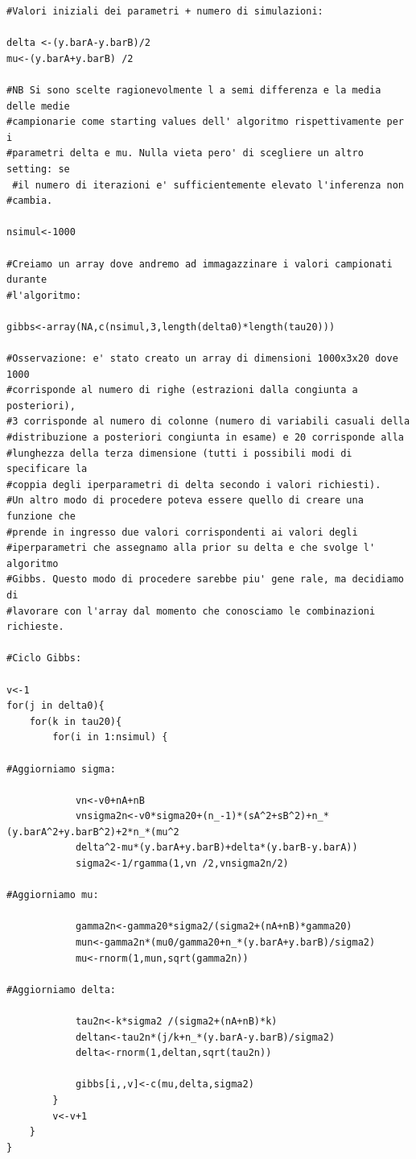 \begin{itemize}
\begin{lstlisting}[style=R]
#Valori iniziali dei parametri + numero di simulazioni:

delta <-(y.barA-y.barB)/2
mu<-(y.barA+y.barB) /2

#NB Si sono scelte ragionevolmente l a semi differenza e la media delle medie
#campionarie come starting values dell' algoritmo rispettivamente per i
#parametri delta e mu. Nulla vieta pero' di scegliere un altro setting: se
 #il numero di iterazioni e' sufficientemente elevato l'inferenza non
#cambia.

nsimul<-1000

#Creiamo un array dove andremo ad immagazzinare i valori campionati durante
#l'algoritmo:

gibbs<-array(NA,c(nsimul,3,length(delta0)*length(tau20)))

#Osservazione: e' stato creato un array di dimensioni 1000x3x20 dove 1000
#corrisponde al numero di righe (estrazioni dalla congiunta a posteriori),
#3 corrisponde al numero di colonne (numero di variabili casuali della
#distribuzione a posteriori congiunta in esame) e 20 corrisponde alla
#lunghezza della terza dimensione (tutti i possibili modi di specificare la
#coppia degli iperparametri di delta secondo i valori richiesti).
#Un altro modo di procedere poteva essere quello di creare una funzione che
#prende in ingresso due valori corrispondenti ai valori degli
#iperparametri che assegnamo alla prior su delta e che svolge l' algoritmo
#Gibbs. Questo modo di procedere sarebbe piu' gene rale, ma decidiamo di
#lavorare con l'array dal momento che conosciamo le combinazioni richieste.

#Ciclo Gibbs:

v<-1
for(j in delta0){
	for(k in tau20){
		for(i in 1:nsimul) {

#Aggiorniamo sigma:

			vn<-v0+nA+nB
			vnsigma2n<-v0*sigma20+(n_-1)*(sA^2+sB^2)+n_*(y.barA^2+y.barB^2)+2*n_*(mu^2
			delta^2-mu*(y.barA+y.barB)+delta*(y.barB-y.barA))
			sigma2<-1/rgamma(1,vn /2,vnsigma2n/2)

#Aggiorniamo mu:

			gamma2n<-gamma20*sigma2/(sigma2+(nA+nB)*gamma20)
			mun<-gamma2n*(mu0/gamma20+n_*(y.barA+y.barB)/sigma2)
			mu<-rnorm(1,mun,sqrt(gamma2n))

#Aggiorniamo delta:

			tau2n<-k*sigma2 /(sigma2+(nA+nB)*k)
			deltan<-tau2n*(j/k+n_*(y.barA-y.barB)/sigma2)
			delta<-rnorm(1,deltan,sqrt(tau2n))

			gibbs[i,,v]<-c(mu,delta,sigma2)
		}
		v<-v+1
	}
}


\end{lstlisting}
\end{itemize}

